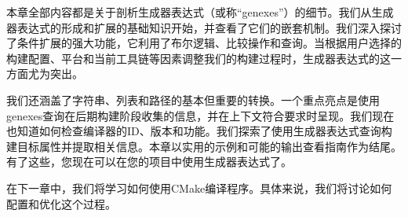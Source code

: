 

本章全部内容都是关于剖析生成器表达式（或称“genexes”）的细节。我们从生成器表达式的形成和扩展的基础知识开始，并查看了它们的嵌套机制。我们深入探讨了条件扩展的强大功能，它利用了布尔逻辑、比较操作和查询。当根据用户选择的构建配置、平台和当前工具链等因素调整我们的构建过程时，生成器表达式的这一方面尤为突出。

我们还涵盖了字符串、列表和路径的基本但重要的转换。一个重点亮点是使用genexes查询在后期构建阶段收集的信息，并在上下文符合要求时呈现。我们现在也知道如何检查编译器的ID、版本和功能。我们探索了使用生成器表达式查询构建目标属性并提取相关信息。本章以实用的示例和可能的输出查看指南作为结尾。有了这些，您现在可以在您的项目中使用生成器表达式了。

在下一章中，我们将学习如何使用CMake编译程序。具体来说，我们将讨论如何配置和优化这个过程。